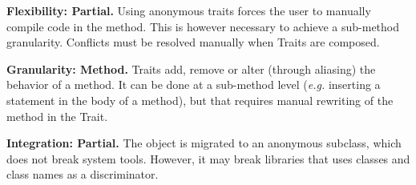 \documentclass[10pt,twoside,english]{_support/latex/sbabook/sbabook}
\begin{document}
\textbf{Flexibility: Partial.} Using anonymous traits forces the user to manually compile code in the method. This is however necessary to achieve a sub-method granularity. Conflicts must be resolved manually when Traits are composed.

\textbf{Granularity: Method.} Traits add, remove or alter (through aliasing) the behavior of a method. It can be done at a sub-method level (\textit{e.g.} inserting a statement in the body of a method), but that requires manual rewriting of the method in the Trait.

\textbf{Integration: Partial.} The object is migrated to an anonymous subclass, which does not break system tools. However, it may break libraries that uses classes and class names as a discriminator.







\backmatter

\end{document}
